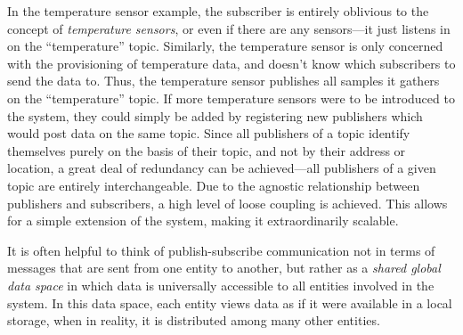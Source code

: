In the temperature sensor example, the subscriber is entirely oblivious to the concept of \emph{temperature sensors}, or even if there are any sensors---it just listens in on the ``temperature'' topic. Similarly, the temperature sensor is only concerned with the provisioning of temperature data, and doesn't know which subscribers to send the data to. Thus, the temperature sensor publishes all samples it gathers on the ``temperature'' topic. If more temperature sensors were to be introduced to the system, they could simply be added by registering new publishers which would post data on the same topic. Since all publishers of a topic identify themselves purely on the basis of their topic, and not by their address or location, a great deal of redundancy can be achieved---all publishers of a given topic are entirely interchangeable.
Due to the agnostic relationship between publishers and subscribers, a high level of loose coupling is achieved. This allows for a simple extension of the system, making it extraordinarily scalable.

It is often helpful to think of publish-subscribe communication not in terms of messages that are sent from one entity to another, but rather as a \emph{shared global data space} in which data is universally accessible to all entities involved in the system. In this data space, each entity views data as if it were available in a local storage, when in reality, it is distributed among many other entities.

